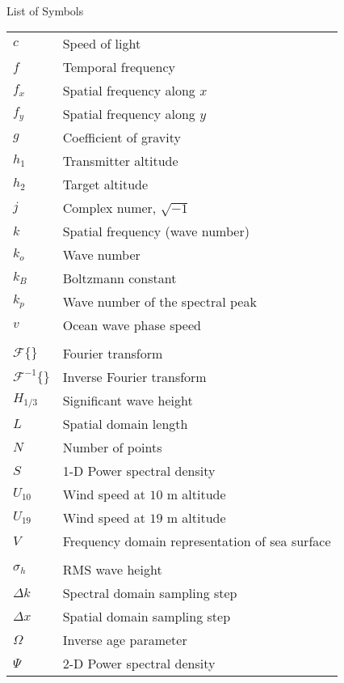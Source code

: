 \renewcommand{\baselinestretch}{1}
\small\normalsize
\hbox{\ }

\vspace{-4em}

\begin{center}
\large{List of Symbols}
\end{center} 

\vspace{3pt}

\begin{supertabular}{ll}
$c$ & Speed of light \\
$f$ & Temporal frequency \\
$f_x$ & Spatial frequency along $x$ \\
$f_y$ & Spatial frequency along $y$ \\
$g$ & Coefficient of gravity \\
$h_1$ & Transmitter altitude\\
$h_2$ & Target altitude \\
$j$ & Complex numer, $\sqrt{-1}$ \\
$k$ & Spatial frequency (wave number) \\
$k_o$ & Wave number \\
$k_B$ & Boltzmann constant \\
$k_p$ & Wave number of the spectral peak \\
$v$ & Ocean wave phase speed \\
\\
$\mathcal{F}\{\}$ & Fourier transform \\
$\mathcal{F}^{-1}\{\}$ & Inverse Fourier transform \\
$H_{1/3}$ & Significant wave height \\
$L$ & Spatial domain length \\
$N$ & Number of points \\
$S$ & 1-D Power spectral density \\
$U_{10}$ & Wind speed at $10$ m altitude \\
$U_{19}$ & Wind speed at $19$ m altitude \\
$V$ & Frequency domain representation of sea surface\\
\\
$\sigma_h$ & RMS wave height \\
$\Delta k$ & Spectral domain sampling step \\
$\Delta x$ & Spatial domain sampling step \\
$\Omega$ & Inverse age parameter \\
$\Psi $ & 2-D Power spectral density \\
\end{supertabular}